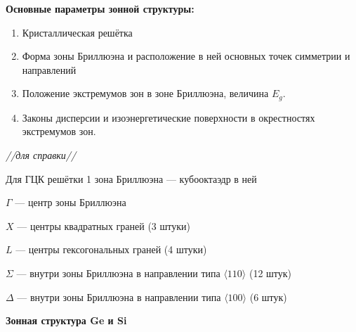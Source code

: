 \textbf{Основные параметры зонной структуры:}

\begin{enumerate}
    \item Кристаллическая решётка
    \item Форма зоны Бриллюэна и расположение в ней основных точек симметрии и направлений
    \item Положение экстремумов зон в зоне Бриллюэна, величина $E_g$.
    \item Законы дисперсии и изоэнергетические поверхности в окрестностях экстремумов зон.
\end{enumerate}

\textit{//для справки//}

Для ГЦК решётки 1 зона Бриллюэна --- кубооктаэдр в ней

$\Gamma$ --- центр зоны Бриллюэна

$X$ --- центры квадратных граней (3 штуки)

$L$ --- центры гексогональных граней (4 штуки)

$\Sigma$ --- внутри зоны Бриллюэна в направлении типа $\langle 110 \rangle$ (12 штук)

$\Delta$ --- внутри зоны Бриллюэна в направлении типа $\langle 100 \rangle$ (6 штук)



\textbf{Зонная структура Ge и Si}

